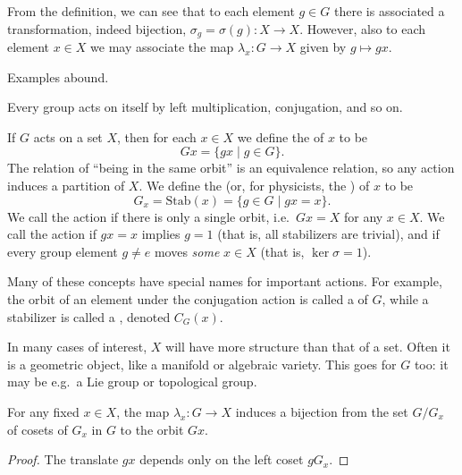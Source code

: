 From the definition, we can see that to each element $g \in G$ there is associated a transformation, indeed bijection, $\sigma_g = \sigma(g) : X \to X$. However, also to each element $x \in X$ we may associate the map $\lambda_x : G \to X$ given by $g \mapsto gx$.

Examples abound. 

\begin{example}
Every group acts on itself by left multiplication, conjugation, and so on.
\end{example}

If $G$ acts on a set $X$, then for each $x \in X$ we define the  of $x$ to be
\[ Gx = \{ gx \mid g \in G \}. \]
The relation of ``being in the same orbit'' is an equivalence relation, so any action induces a partition of $X$. We define the  (or, for physicists, the ) of $x$ to be
\[ G_x = \mathrm{Stab}(x) = \{ g \in G \mid gx=x \}. \]
We call the action  if there is only a single orbit, i.e.\ $Gx=X$ for any $x \in X$. We call the action  if $gx=x$ implies $g=1$ (that is, all stabilizers are trivial), and  if every group element $g \neq e$ moves \emph{some} $x \in X$ (that is, $\ker \sigma = 1$).

\begin{remark}
Many of these concepts have special names for important actions. For example, the orbit of an element under the conjugation action is called a  of $G$, while a stabilizer is called a , denoted $C_G(x)$.
\end{remark}

\begin{remark}
In many cases of interest, $X$ will have more structure than that of a set. Often it is a geometric object, like a manifold or algebraic variety. This goes for $G$ too: it may be e.g.\ a Lie group or topological group.
\end{remark}

\begin{theorem}
For any fixed $x \in X$, the map $\lambda_x : G \to X$ induces a bijection from the set $G/G_x$ of cosets of $G_x$ in $G$ to the orbit $Gx$.
\end{theorem}

\begin{proof}
The translate $gx$ depends only on the left coset $gG_x$.
\end{proof}

